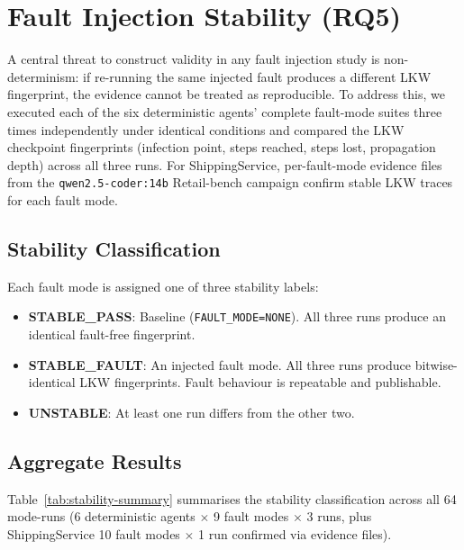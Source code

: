 \documentclass[conference]{IEEEtran}
\begin{document}
\FloatBarrier  %
\section{Fault Injection Stability (RQ5)}
\label{sec:stability}

A central threat to construct validity in any fault injection study is
non-determinism: if re-running the same injected fault produces a different LKW
fingerprint, the evidence cannot be treated as reproducible. To address this, we
executed each of the six deterministic agents' complete fault-mode suites three
times independently under identical conditions and compared the LKW checkpoint
fingerprints (infection point, steps reached, steps lost, propagation depth)
across all three runs. For ShippingService, per-fault-mode evidence files
from the \texttt{qwen2.5-coder:14b} Retail-bench campaign confirm stable LKW
traces for each fault mode.

\subsection{Stability Classification}

Each fault mode is assigned one of three stability labels:
\begin{itemize}
  \item \textbf{STABLE\_PASS}: Baseline (\texttt{FAULT\_MODE=NONE}). All three
        runs produce an identical fault-free fingerprint.
  \item \textbf{STABLE\_FAULT}: An injected fault mode. All three runs produce
        bitwise-identical LKW fingerprints. Fault behaviour is repeatable and
        publishable.
  \item \textbf{UNSTABLE}: At least one run differs from the other two.
\end{itemize}

\subsection{Aggregate Results}

Table~\ref{tab:stability-summary} summarises the stability classification across
all 64 mode-runs (6 deterministic agents $\times$ 9 fault modes $\times$ 3 runs,
plus ShippingService 10 fault modes $\times$ 1 run confirmed via evidence files).
\end{document}
